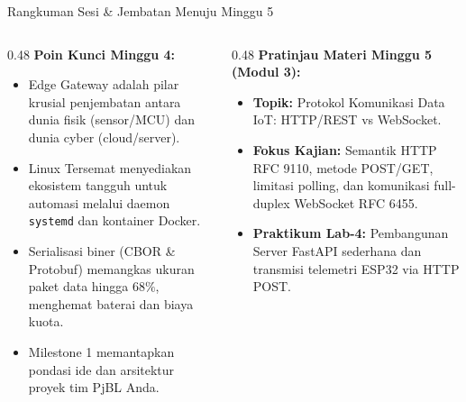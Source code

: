 \documentclass[aspectratio=169,10pt]{beamer}
\begin{document}
\begin{frame}{Rangkuman Sesi \& Jembatan Menuju Minggu 5}
    \begin{columns}[T]
        \begin{column}{0.48\textwidth}
            \textbf{Poin Kunci Minggu 4:}
            \begin{itemize}
                \item Edge Gateway adalah pilar krusial penjembatan antara dunia fisik (sensor/MCU) dan dunia cyber (cloud/server).
                \item Linux Tersemat menyediakan ekosistem tangguh untuk automasi melalui daemon \texttt{systemd} dan kontainer Docker.
                \item Serialisasi biner (CBOR \& Protobuf) memangkas ukuran paket data hingga $68\%$, menghemat baterai dan biaya kuota.
                \item Milestone 1 memantapkan pondasi ide dan arsitektur proyek tim PjBL Anda.
            \end{itemize}
        \end{column}
        \begin{column}{0.48\textwidth}
            \textbf{Pratinjau Materi Minggu 5 (Modul 3):}
            \begin{itemize}
                \item \textbf{Topik:} Protokol Komunikasi Data IoT: HTTP/REST vs WebSocket.
                \item \textbf{Fokus Kajian:} Semantik HTTP RFC 9110, metode POST/GET, limitasi polling, dan komunikasi full-duplex WebSocket RFC 6455.
                \item \textbf{Praktikum Lab-4:} Pembangunan Server FastAPI sederhana dan transmisi telemetri ESP32 via HTTP POST.
            \end{itemize}
        \end{column}
    \end{columns}
\end{frame}
\end{document}
